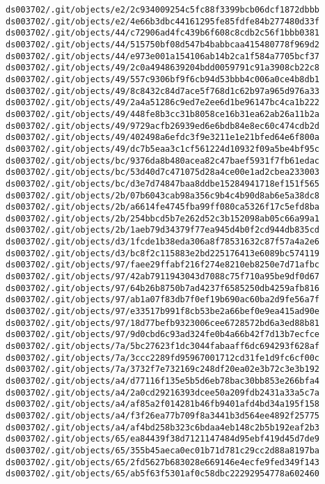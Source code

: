 \documentclass[11pt]{article}
\begin{document}
\begin{Verbatim}[commandchars=\\\{\}]
ds003702/.git/objects/e2/2c934009254c5fc88f3399bcb06dcf1872dbbb
ds003702/.git/objects/e2/4e66b3dbc44161295fe85fdfe84b277480d33f
ds003702/.git/objects/44/c72906ad4fc439b6f608c8cdb2c56f1bbb0381
ds003702/.git/objects/44/515750bf08d547b4babbcaa415480778f969d2
ds003702/.git/objects/44/e973e001a154106ab14b2ca1f584a7705bcf37
ds003702/.git/objects/49/2c0a4948639204bdd0059791c91a3908cb22c8
ds003702/.git/objects/49/557c9306bf9f6cb94d53bbb4c006a0ce4b8db1
ds003702/.git/objects/49/8c8432c84d7ace5f768d1c62b97a965d976a33
ds003702/.git/objects/49/2a4a51286c9ed7e2ee6d1be96147bc4ca1b222
ds003702/.git/objects/49/448fe8b3cc31b8058ce16b31ea62ab26a11b2a
ds003702/.git/objects/49/9729acfb26939ed6e6bdb84e8ec60c474cdb2d
ds003702/.git/objects/49/402498a6efdc3f9e3211e1e21bfed64e6f800a
ds003702/.git/objects/49/dc7b5eaa3c1cf561224d10932f09a5be4bf95c
ds003702/.git/objects/bc/9376da8b480acea82c47baef5931f7fb61edac
ds003702/.git/objects/bc/53d40d7c471075d28a4ce00e1ad2cbea233003
ds003702/.git/objects/bc/d3e7d74847baa8ddbe15284941718ef151f565
ds003702/.git/objects/2b/07b6043cab98a356c9b4c4b90d8ab6e5a38dc8
ds003702/.git/objects/2b/a6614fe4745fba99ff080ca5326f17c5efd8ba
ds003702/.git/objects/2b/254bbcd5b7e262d52c3b152098ab05c66a99a1
ds003702/.git/objects/2b/1aeb79d34379f77ea945d4b0f2cd944db835cd
ds003702/.git/objects/d3/1fcde1b38eda306a8f78531632c87f57a4a2e6
ds003702/.git/objects/d3/bc8f2c115883e2bd225176413e6089bc574119
ds003702/.git/objects/97/faee29ffabf216f274e8210eb8250e7d71afbc
ds003702/.git/objects/97/42ab7911943043d7088c75f710a95be9df0d67
ds003702/.git/objects/97/64b26b8750b7ad4237f6585250db4259afb816
ds003702/.git/objects/97/ab1a07f83db7f0ef19b690ac60ba2d9fe56a7f
ds003702/.git/objects/97/e33517b991f8cb53be2a66bef0e9ea415ad90e
ds003702/.git/objects/97/18d77befb9323006cee6728572bd6a3ed88b81
ds003702/.git/objects/97/9d0cbd6c93ad324fe0b4a66b42f7d13b7ecfce
ds003702/.git/objects/7a/5bc27623f1dc3044fabaaff6dc694293f628af
ds003702/.git/objects/7a/3ccc2289fd95967001712cd31fe1d9fc6cf00c
ds003702/.git/objects/7a/3732f7e732169c248df20ea02e3b72c3e3b192
ds003702/.git/objects/a4/d77116f135e5b5d6eb78bac30bb853e266bfa4
ds003702/.git/objects/a4/2a0cd29216393dcee50a209fdb2431a33a5c7a
ds003702/.git/objects/a4/af85a2f014281b46fb9401afd4bd34a195f158
ds003702/.git/objects/a4/f3f26ea77b709f8a3441b3d564ee4892f25775
ds003702/.git/objects/a4/af4bd258b323c6bdaa4eb148c2b5b192eaf2b3
ds003702/.git/objects/65/ea84439f38d7121147484d95ebf419d45d7de9
ds003702/.git/objects/65/355b45aeca0ec01b71d781c29cc2d88a8197ba
ds003702/.git/objects/65/2fd5627b683028e669146e4ecfe9fed349f143
ds003702/.git/objects/65/ab5f63f5301af0c58dbc22292954778a602460

\end{Verbatim}
\end{document}
